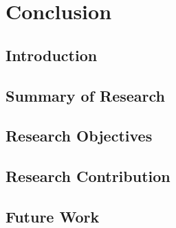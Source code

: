 \chapter{Conclusion}\label{chap:conclusion}
\guideconclusion %
\section{Introduction}
\label{sec:conclusion-introduction}


\section{Summary of Research}
\label{sec:conclusion-summary}


\section{Research Objectives}
\label{sec:conclusion-objectives}


\section{Research Contribution}
\label{sec:conclusion-contribution}


\section{Future Work}
\label{sec:conclusion-future-work}


